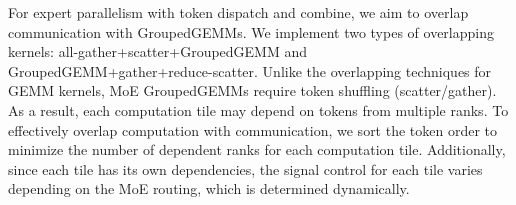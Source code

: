 For expert parallelism with token dispatch and combine, we aim to overlap communication with GroupedGEMMs. We implement two types of overlapping kernels: all-gather+scatter+GroupedGEMM and GroupedGEMM+gather+reduce-scatter. Unlike the overlapping techniques for GEMM kernels, MoE GroupedGEMMs require token shuffling (scatter/gather). As a result, each computation tile may depend on tokens from multiple ranks. To effectively overlap computation with communication, we sort the token order to minimize the number of dependent ranks for each computation tile. Additionally, since each tile has its own dependencies, the signal control for each tile varies depending on the MoE routing, which is determined dynamically.

